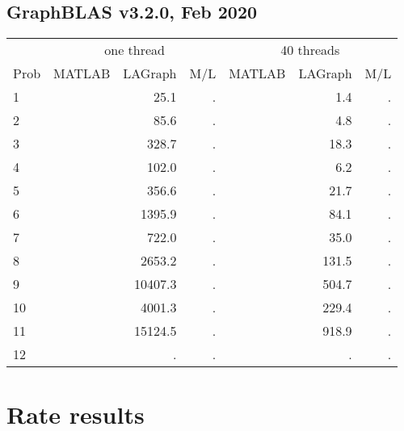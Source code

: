 \documentclass[12pt]{article}
\begin{document}
\subsection{GraphBLAS v3.2.0, Feb 2020}

{\small
\begin{tabular}{l|rr|r||rr|r}
\hline
     & \multicolumn{3}{c}{one thread}                &  \multicolumn{3}{c}{40 threads}  \\
Prob & MATLAB         & LAGraph        & M/L         &   MATLAB      & LAGraph       & M/L        \\
\hline
  1  &                &          25.1  &      .      &               &          1.4  &      .     \\
  2  &                &          85.6  &      .      &               &          4.8  &      .     \\
  3  &                &         328.7  &      .      &               &         18.3  &      .     \\
\hline
  4  &                &         102.0  &      .      &               &          6.2  &      .     \\
  5  &                &         356.6  &      .      &               &         21.7  &      .     \\
  6  &                &        1395.9  &      .      &               &         84.1  &      .     \\
\hline
  7  &                &         722.0  &      .      &               &         35.0  &      .     \\
  8  &                &        2653.2  &      .      &               &        131.5  &      .     \\
  9  &                &       10407.3  &      .      &               &        504.7  &      .     \\
\hline
 10  &                &        4001.3  &      .      &               &        229.4  &      .     \\
 11  &                &       15124.5  &      .      &               &        918.9  &      .     \\
 12  &                &            .   &      .      &               &           .   &      .     \\
\end{tabular}
}

\newpage
\section{Rate results}
\end{document}
